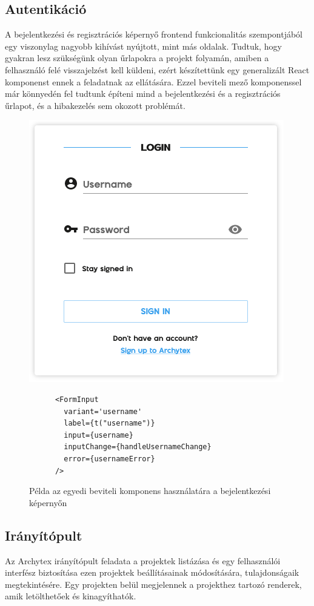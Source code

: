 \subsection{Autentikáció}
A bejelentkezési és regisztrációs képernyő frontend funkcionalitás szempontjából egy viszonylag nagyobb kihívást nyújtott, mint más oldalak. Tudtuk, hogy gyakran lesz szükségünk olyan űrlapokra a projekt folyamán, amiben a felhasználó felé visszajelzést kell küldeni, ezért készítettünk egy generalizált React komponenst ennek a feladatnak az ellátására. Ezzel beviteli mező komponenssel már könnyedén fel tudtunk építeni mind a bejelentkezési és a regisztrációs űrlapot, és a hibakezelés sem okozott problémát.

\begin{figure}[H]
  \centering
  \begin{minipage}{.5\textwidth}
    \centering
    \includegraphics[width=.6\linewidth]{parts/developer-documentation/frontend/images/login.png}
    \label{fig:loginPage}
  \end{minipage}%
  \begin{minipage}{.5\textwidth}
    \centering
    \begin{lstlisting}
      <FormInput
        variant='username'
        label={t("username")}
        input={username}
        inputChange={handleUsernameChange}
        error={usernameError}
      />\end{lstlisting}
  \end{minipage}
  \caption{Példa az egyedi beviteli komponens használatára a bejelentkezési képernyőn}
\end{figure}

\pagebreak

\subsection{Irányítópult}
Az Archytex irányítópult feladata a projektek listázása és egy felhasználói interfész biztosítása ezen projektek beállításainak módosítására, tulajdonságaik megtekintésére. Egy projekten belül megjelennek a projekthez tartozó renderek, amik letölthetőek és kinagyíthatók.


